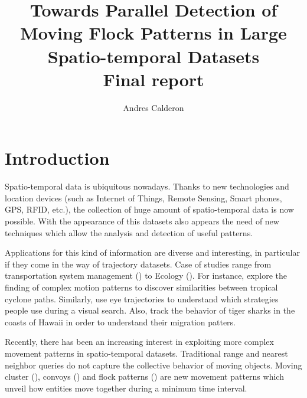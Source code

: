 \documentclass[12pt]{scrartcl}
\title{Towards Parallel Detection of Moving Flock Patterns in Large Spatio-temporal Datasets\\ \normalsize{Final report}}
\author{Andres Calderon}
\begin{document}
\maketitle
 
\section{Introduction}
% 

Spatio-temporal data is ubiquitous nowadays. Thanks to new technologies and location devices (such as Internet of Things, Remote Sensing, Smart phones, GPS, RFID, etc.), the collection of huge amount of spatio-temporal data is now possible. With the appearance of this datasets also appears the need of new techniques which allow the analysis and detection of useful patterns.  

Applications for this kind of information are diverse and interesting, in particular if they come in the way of trajectory datasets. Case of studies range from transportation system management (\cite{di_lorenzo_allaboard:_2016,johansson_efficiency_2015}) to Ecology (\cite{johnston_abundance_2015, la_sorte_convergence_2016}).  For instance, \cite{turdukulov_visual_2014} explore the finding of complex motion patterns to discover similarities between tropical cyclone paths.  Similarly, \cite{amor_persistence_2016} use eye trajectories to understand which strategies people use during a visual search. Also, \cite{holland_movements_1999} track the behavior of tiger sharks in the coasts of Hawaii in order to understand their migration patters.

Recently, there has been an increasing interest in exploiting more complex movement patterns in spatio-temporal datasets.  Traditional range and nearest neighbor queries do not capture the collective behavior of moving objects.  Moving cluster (\cite{kalnis_discovering_2005}), convoys (\cite{jeung_discovery_2008}) and flock patterns (\cite{benkert_reporting_2008, gudmundsson_computing_2006}) are new movement patterns which unveil how entities move together during a minimum time interval.  
\end{document}
